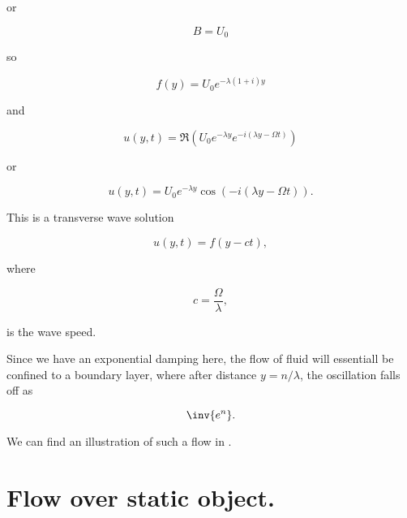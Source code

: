 or 

\begin{equation}\label{eqn:continuumL17:n}
B = U_0
\end{equation}

so 

\begin{equation}\label{eqn:continuumL17:n}
f(y) = U_0 e^{-\lambda (1 + i) y}
\end{equation}

and

\begin{equation}\label{eqn:continuumL17:n}
u(y, t) = 
\Re\left(
U_0 e^{-\lambda y} e^{ -i (\lambda y - \Omega t) }
\right)
\end{equation}

or

\begin{equation}\label{eqn:continuumL17:n}
u(y, t) = 
U_0 e^{-\lambda y} \cos\left( -i (\lambda y - \Omega t) \right).
\end{equation}

This is a transverse wave solution

\begin{equation}\label{eqn:continuumL17:n}
u(y, t) = f(y - c t),
\end{equation}

where 

\begin{equation}\label{eqn:continuumL17:n}
c = \frac{\Omega}{\lambda},
\end{equation}

is the wave speed.

Since we have an exponential damping here, the flow of fluid will essentiall be confined to a boundary layer, where after distance $y = n/\lambda$, the oscillation falls off as

\begin{equation}\label{eqn:continuumL17:n}
\inv{e^n}.
\end{equation}

We can find an illustration of such a flow in \cite{wiki:StokesBoundary}.

\section{Flow over static object.}


\EndArticle

